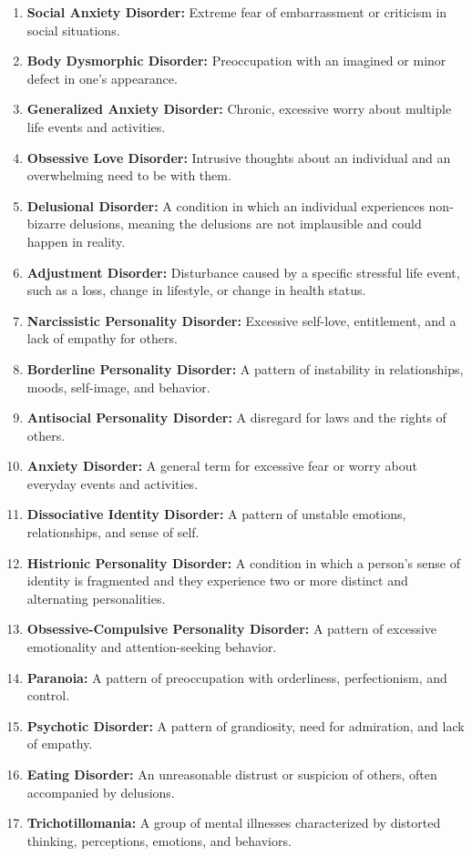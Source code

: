 \documentclass[12pt]{book}
\begin{document}
\begin{enumerate}
    \item \textbf{Social Anxiety Disorder:} Extreme fear of embarrassment or criticism in social situations.
    \item \textbf{Body Dysmorphic Disorder:} Preoccupation with an imagined or minor defect in one’s appearance.
    \item \textbf{Generalized Anxiety Disorder:} Chronic, excessive worry about multiple life events and activities.
    \item \textbf{Obsessive Love Disorder:} Intrusive thoughts about an individual and an overwhelming need to be with them.
    \item \textbf{Delusional Disorder:} A condition in which an individual experiences non-bizarre delusions, meaning the delusions are not implausible and could happen in reality.
    \item \textbf{Adjustment Disorder:} Disturbance caused by a specific stressful life event, such as a loss, change in lifestyle, or change in health status.
    \item \textbf{Narcissistic Personality Disorder:} Excessive self-love, entitlement, and a lack of empathy for others.
    \item \textbf{Borderline Personality Disorder:} A pattern of instability in relationships, moods, self-image, and behavior.
    \item \textbf{Antisocial Personality Disorder:} A disregard for laws and the rights of others.
    \item \textbf{Anxiety Disorder:} A general term for excessive fear or worry about everyday events and activities.
    \item \textbf{Dissociative Identity Disorder:} A pattern of unstable emotions, relationships, and sense of self.
    \item \textbf{Histrionic Personality Disorder:} A condition in which a person's sense of identity is fragmented and they experience two or more distinct and alternating personalities.
    \item \textbf{Obsessive-Compulsive Personality Disorder:} A pattern of excessive emotionality and attention-seeking behavior.
    \item \textbf{Paranoia:} A pattern of preoccupation with orderliness, perfectionism, and control.
    \item \textbf{Psychotic Disorder:} A pattern of grandiosity, need for admiration, and lack of empathy.
    \item \textbf{Eating Disorder:} An unreasonable distrust or suspicion of others, often accompanied by delusions.
    \item \textbf{Trichotillomania:} A group of mental illnesses characterized by distorted thinking, perceptions, emotions, and behaviors.
\end{enumerate}
\end{document}
